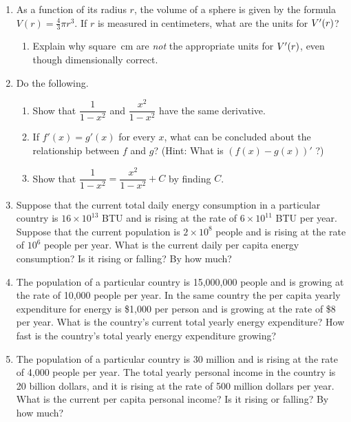 \begin{enumerate}
\item As a function of its radius $r$, the volume of a sphere is given
by the formula $V(r) = \frac43 \pi r^3$.  If $r$ is measured in
centimeters, what are the units for $V'(r)\/$?

  \begin{enumerate}
  \item Explain why square~cm are {\em not} the appropriate units for
$V'(r)\/$, even though dimensionally correct.


\end{enumerate}
\item Do the following.

  \begin{enumerate}
  \item Show that $\dfrac{1}{{1 - x^2}}$ and $\dfrac{x^2}{{1 - x^2}}$
have the same derivative.

  \item If $f'(x) = g'(x)$ for every $x$, what can be concluded about the
relationship between $f$ and $g$?  (Hint: What is $(f(x) - g(x))'$ ?)


  \item Show that $\dfrac{1}{1 - x^2} = \dfrac{x^2}{{1 - x^2}} + C$ by
  finding $C$.


\end{enumerate}
\item Suppose that the current total daily energy consumption in a
particular country is $16 \times 10^{13}$ BTU and is rising at the
rate of $6 \times 10^{11}$ BTU per year.  Suppose that the current
population is $2 \times 10^{8}$ people and is rising at the rate of
$10^6$ people per year.  What is the current daily per capita energy
consumption?  Is it rising or falling?  By how much?


\item The population of a particular country is 15,000,000 people and
is growing at the rate of 10,000 people per year.  In the same country
the per capita yearly expenditure for energy is \$1,000 per person and
is growing at the rate of \$8 per year.  What is the country's current
total yearly energy expenditure?  How fast is the country's total
yearly energy expenditure growing?


\item The population of a particular country is 30 million and is
rising at the rate of 4,000 people per year.  The total yearly
personal income in the country is 20 billion dollars, and it is rising
at the rate of 500 million dollars per year.  What is the current per
capita personal income?  Is it rising or falling?  By how much?



\end{enumerate}
